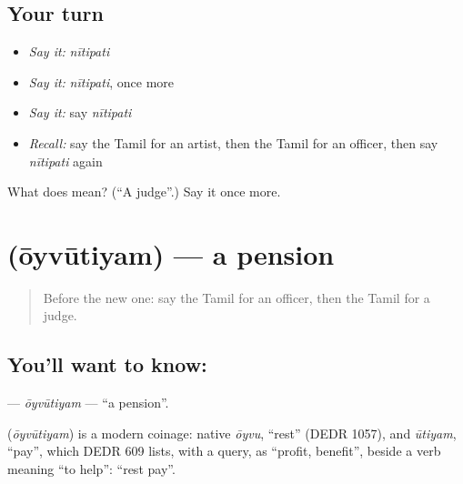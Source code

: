 \subsection*{Your turn}
\begin{itemize}
\raggedright
  \item \emph{Say it:} \emph{nītipati}
  \item \emph{Say it:} \emph{nītipati}, once more
  \item \emph{Say it:} say \emph{nītipati}
  \item \emph{Recall:} say the Tamil for an artist, then the Tamil for an officer, then say \emph{nītipati} again
\end{itemize}

\begin{tcolorbox}[breakable,colback=teal!4,colframe=teal!35!black,title={Before you move on}]
What does  mean? (\textquotedblleft{}A judge\textquotedblright{}.) Say it once more.
\end{tcolorbox}
\section[\texorpdfstring{\ta{ஓய்வூதியம்} (ōyvūtiyam)}{ஓய்வூதியம் (ōyvūtiyam)}]{ (ōyvūtiyam) — a pension}

\label{lesson:TA-C253-oyvutiyam}



\begin{quote}
Before the new one: say the Tamil for an officer, then the Tamil for a judge.
\end{quote}

\subsection*{You'll want to know: }
\textbf{} — \emph{ōyvūtiyam} — \textquotedblleft{}a pension\textquotedblright{}.

\begin{cousinweb}
\textbf{} (\emph{ōyvūtiyam}) is a modern coinage: native \emph{ōyvu}, \textquotedblleft{}rest\textquotedblright{} (DEDR 1057), and \emph{ūtiyam}, \textquotedblleft{}pay\textquotedblright{}, which DEDR 609 lists, with a query, as \textquotedblleft{}profit, benefit\textquotedblright{}, beside a verb meaning \textquotedblleft{}to help\textquotedblright{}: \textquotedblleft{}rest pay\textquotedblright{}.
\end{cousinweb}

